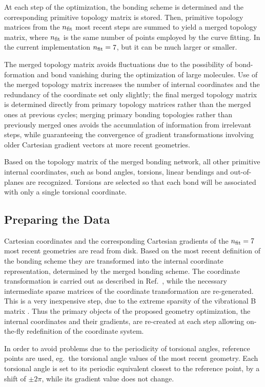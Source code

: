 \documentclass[prl,aps,preprint,superbib,12pt]{revtex4}
\begin{document}
At each step of the optimization, the  bonding scheme is determined and the corresponding 
primitive topology matrix is stored.  Then, primitive topology matrices from the 
$n_{\rm fit}$ most  recent steps are summed to yield a merged topology matrix, where 
$n_{\rm fit}$ is the same number of points employed by the curve fitting.   
In the current implementation $n_{\rm fit}=7$, but it can be much larger or smaller.  

The merged topology matrix avoids fluctuations due to the possibility of bond-formation and
bond vanishing during the optimization of large molecules.  Use of the merged topology matrix
increases the number of internal coordinates and the redundancy of the coordinate set only slightly;
the final merged topology matrix is determined directly from primary topology matrices rather
than the merged ones at previous cycles; merging  primary bonding topologies rather than previously
merged ones avoids the accumulation of information from irrelevant steps, while guaranteeing the convergence of gradient
transformations involving older Cartesian gradient vectors at more recent geometries.

Based on the topology matrix of the merged bonding network, all other primitive 
internal coordinates, such as bond angles, torsions, linear bendings and 
out-of-planes are recognized. Torsions are selected so that each bond will be 
associated with only a single torsional coordinate.

\subsection{Preparing the Data}

Cartesian coordinates and the corresponding Cartesian gradients of the $n_{\rm fit}=7$ 
most recent geometries are read from disk. Based on the most recent definition of the 
bonding scheme they are transformed into the internal coordinate representation,
determined by the merged bonding scheme.  The coordinate transformation is carried out as 
described in Ref.~, while the necessary intermediate sparse matrices of 
the coordinate transformation are re-generated. This is a very inexpensive step, due to the 
extreme sparsity of the vibrational B matrix \cite{EWilson55}. 
Thus the primary objects of the proposed geometry optimization,  the internal coordinates and their gradients,
are re-created at each step allowing on-the-fly redefinition of the 
coordinate system.

In order to avoid problems due to the periodicity of torsional angles, reference points are used, 
eg.~the torsional angle values of the most recent geometry. Each torsional angle is set to its 
periodic equivalent closest to the reference point, by a shift of $\pm 2\pi$, while its gradient value 
does not change.
\end{document}
